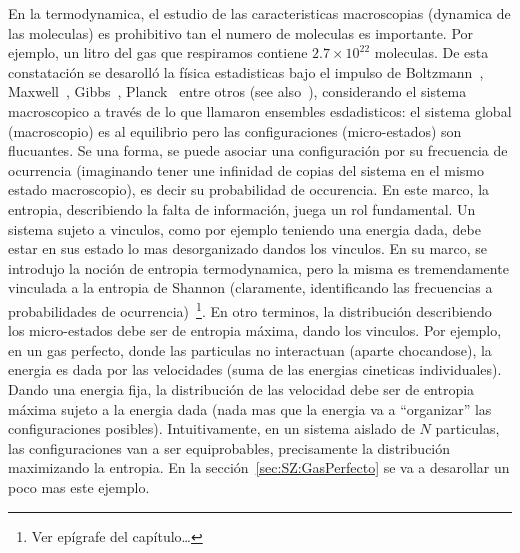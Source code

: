 \label{s:SZ:Desigualdades}




\label{sec:SZ:MaxEnt}

En la termodynamica, el estudio de las caracteristicas macroscopias (dynamica de
las  moleculas) es prohibitivo  tan el  numero de  moleculas es  importante. Por
ejemplo,  un  litro  del  gas  que  respiramos  contiene  $2.7  \times  10^{22}$
moleculas. De  esta constataci\'on se desaroll\'o la  f\'isica estadisticas bajo
el    impulso    de    Boltzmann~\cite{Bol96,   Bol98},    Maxwell~\cite{Max67},
Gibbs~\cite{Gib02},  Planck~\cite{Pla15}  entre  otros (see  also~\cite{Jay65}),
considerando el  sistema macroscopico  a trav\'es de  lo que  llamaron ensembles
esdadisticos:  el  sistema  global  (macroscopio)  es  al  equilibrio  pero  las
configuraciones (micro-estados)  son flucuantes. Se una forma,  se puede asociar
una  configuraci\'on  por su  frecuencia  de  ocurrencia  (imaginando tener  une
infinidad de  copias del sistema  en el mismo  estado macroscopio), es  decir su
probabilidad de occurencia.   En este marco, la entropia,  describiendo la falta
de informaci\'on, juega un rol  fundamental.  Un sistema sujeto a vinculos, como
por  ejemplo  teniendo  una energia  dada,  debe  estar  en  sus estado  lo  mas
desorganizado dandos  los vinculos.   En su marco,  se introdujo la  noci\'on de
entropia termodynamica, pero  la misma es tremendamente vinculada  a la entropia
de  Shannon  (claramente,  identificando  las frecuencias  a  probabilidades  de
ocurrencia)~\footnote{Ver ep\'igrafe  del cap\'itulo\ldots}.  En  otro terminos,
la distribuci\'on describiendo los  micro-estados debe ser de entropia m\'axima,
dando los  vinculos. Por ejemplo,  en un gas  perfecto, donde las  particulas no
interactuan (aparte chocandose), la energia es dada por las velocidades (suma de
las energias cineticas individuales).  Dando una energia fija, la distribuci\'on
de las  velocidad debe ser de entropia  m\'axima sujeto a la  energia dada (nada
mas  que   la  energia  va   a  ``organizar''  las   configuraciones  posibles).
Intuitivamente, en un sistema aislado de $N$ particulas, las configuraciones van
a ser equiprobables, precisamente la distribuci\'on maximizando la entropia.  En
la  secci\'on~\ref{sec:SZ:GasPerfecto}  se va  a  desarollar  un  poco mas  este
ejemplo.

